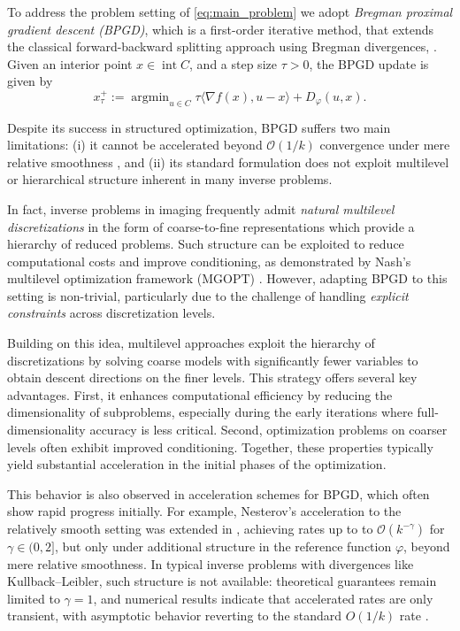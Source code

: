 \documentclass[11pt,reqno]{amsart}
\numberwithin{equation}{section}
\numberwithin{figure}{section}
\theoremstyle{plain}
\theoremstyle{definition}
\newcommand{\mc}[1]{\mathcal{#1}}
\newcommand{\la}{\langle}
\newcommand{\ra}{\rangle}
\newcommand{\vphi}{\varphi}
\newcommand{\df}{\nabla f}
\DeclareMathOperator{\intr}{int}
\DeclareMathOperator*{\argmin}{arg min}
\begin{document}
To address the problem setting of \eqref{eq:main_problem} we adopt \emph{Bregman proximal gradient descent (BPGD)}, which is a first-order iterative method, that extends the classical forward-backward splitting approach using Bregman divergences, \cite{Beck:2003aa}. Given an interior point $x \in \intr C$, and a step size $\tau > 0$, the BPGD update is given by
\begin{equation}\label{eq:BPGD-subproblem}
    x^{+}_\tau := \argmin_{u \in C} \tau \la \df(x), u - x \ra + D_\vphi(u,x).
\end{equation}

Despite its success in structured optimization, BPGD suffers two main limitations: (i) it cannot be accelerated beyond $\mathcal{O}(1/k)$ convergence under mere relative smoothness \cite{Dragomir2021Optimal}, and (ii) its standard formulation does not exploit multilevel or hierarchical structure inherent in many inverse problems.

In fact, inverse problems in imaging frequently admit \emph{natural multilevel discretizations} in the form of coarse-to-fine representations which provide a hierarchy of reduced problems.
Such structure can be exploited to reduce computational costs and improve conditioning, as demonstrated by Nash's multilevel optimization framework (MGOPT) \cite{Nash:2000}. However, adapting BPGD to this setting is non-trivial, particularly due to the challenge of handling \emph{explicit constraints} across discretization levels.

Building on this idea, multilevel approaches exploit the hierarchy of discretizations by solving coarse models with significantly fewer variables to obtain descent directions on the finer levels. This strategy offers several key advantages. First, it enhances computational efficiency by reducing the dimensionality of subproblems, especially during the early iterations where full-dimensionality accuracy is less critical. Second, optimization problems on coarser levels often exhibit improved conditioning. Together, these properties typically yield substantial acceleration in the initial phases of the optimization. 


This behavior is also observed in acceleration schemes for BPGD, which often show rapid progress initially. For example, Nesterov’s acceleration to the relatively smooth setting was extended in \cite{Hanzely:2021vc}, achieving rates up to to $\mc{O}(k^{-\gamma})$ for $\gamma \in (0, 2]$, but only under additional structure in the reference function $\vphi$, beyond mere relative smoothness. In typical inverse problems with divergences like Kullback–Leibler, such structure is not available: theoretical guarantees remain limited to $\gamma = 1$, and numerical results indicate that accelerated rates are only transient, with asymptotic behavior reverting to the standard $O(1/k)$ rate \cite{Raus2024}.
\end{document}
